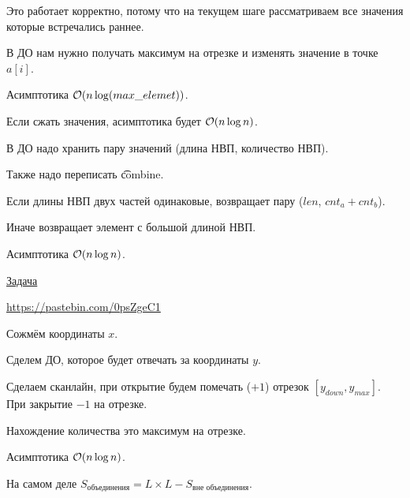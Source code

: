 \down

Это работает корректно, потому что на текущем шаге рассматриваем все значения которые встречались раннее. 

\down

В ДО нам нужно получать максимум на отрезке и изменять значение в точке $a[i]$.

Асимптотика $\mathcal{O}(n \log(max\_elemet))$.

Если сжать значения, асимптотика будет $\mathcal{O}(n \log n)$.


В ДО надо хранить пару значений (длина НВП, количество НВП).

Также надо переписать \t{combine}.

\up \up

\begin{MyList}[0pt]
	\item Если длины НВП двух частей одинаковые, возвращает пару ($len$, $cnt_a + cnt_b$).
	
	\item Иначе возвращает элемент с большой длиной НВП.
\end{MyList} \up \up


Асимптотика $\mathcal{O}(n \log n)$.





\pagebreak


\href{https://informatics.mccme.ru/mod/statements/view3.php?chapterid=111800}{Задача}

\href{КОД}{https://pastebin.com/0psZgeC1}

Сожмём координаты $x$.

Сделем ДО, которое будет отвечать за координаты $y$.

Сделаем сканлайн, при открытие будем помечать ($+1$) отрезок $[y_{down}, y_{max}]$. При закрытие $-1$ на отрезке.

Нахождение количества это максимум на отрезке. 

Асимптотика $\mathcal{O}(n \log n)$.


На самом деле $S_{\text{объединения}}=L \times L - S_{\text{вне объединения}}$. 

